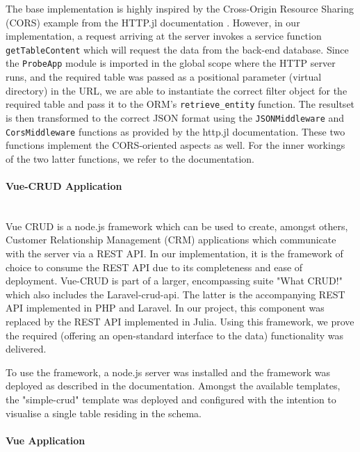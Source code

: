 \documentclass{juliacon}
\begin{document}
The base implementation is highly inspired by the Cross-Origin Resource Sharing (CORS) example from the HTTP.jl documentation \cite{httpjl}. However, in our implementation, a request arriving at the server invokes a service function \texttt{getTableContent} which will request the data from the back-end database. Since the \texttt{ProbeApp} module is imported in the global scope where the HTTP server runs, and the required table was passed as a positional parameter (virtual directory) in the URL, we are able to instantiate the correct filter object for the required table and pass it to the ORM's \texttt{retrieve\_entity} function. The resultset is then transformed to the correct JSON format using the \texttt{JSONMiddleware} and \texttt{CorsMiddleware} functions as provided by the http.jl documentation. These two functions implement the CORS-oriented aspects as well. For the inner workings of the two latter functions, we refer to the documentation.\vskip 6pt

\paragraph{Vue-CRUD Application}\hfill\\

Vue CRUD is a node.js framework which can be used to create, amongst others, Customer Relationship Management (CRM) applications which communicate with the server via a REST API. In our implementation, it is the framework of choice to consume the REST API due to its completeness and ease of deployment. Vue-CRUD is part of a larger, encompassing suite "What CRUD!" which also includes the Laravel-crud-api. The latter is the accompanying REST API implemented in PHP and Laravel. In our project, this component was replaced by the REST API implemented in Julia. Using this framework, we prove the required (offering an open-standard interface to the data) functionality was delivered. \vskip 6pt

To use the framework, a node.js server was installed and the framework was deployed as described in the documentation. Amongst the available templates, the "simple-crud" template was deployed and configured with the intention to visualise a single table residing in the schema.\vskip 6pt


\paragraph{Vue Application}\hfill\\
\end{document}
